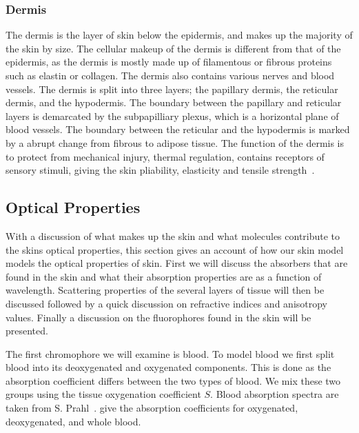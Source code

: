 \subsubsection*{Dermis} %
\label{sub:dermis}
The dermis is the layer of skin below the epidermis, and makes up the majority of the skin by size.
The cellular makeup of the dermis is different from that of the epidermis, as the dermis is mostly made up of filamentous or fibrous proteins such as elastin or collagen.
The dermis also contains various nerves and blood vessels.
The dermis is split into three layers; the papillary dermis, the reticular dermis, and the hypodermis.
The boundary between the papillary and reticular layers is demarcated by the subpapilliary plexus, which is a horizontal plane of blood vessels.
The boundary between the reticular and the hypodermis is marked by a abrupt change from fibrous to adipose tissue.
The function of the dermis is to protect from mechanical injury, thermal regulation, contains receptors of sensory stimuli, giving the skin pliability, elasticity and tensile strength~\cite{freedberg1999fitzpatrick,zaidi2010dermatology}.
 


\subsection*{Optical Properties} %
\label{sub:optical_properties}



With a discussion of what makes up the skin and what molecules contribute to the skins optical properties, this section gives an account of how our skin model models the optical properties of skin.
First we will discuss the absorbers that are found in the skin and what their absorption properties are as a function of wavelength.
Scattering properties of the several layers of tissue will then be discussed followed by a quick discussion on refractive indices and anisotropy values.
Finally a discussion on the fluorophores found in the skin will be presented.

\medskip

The first chromophore we will examine is blood.
To model blood we first split blood into its deoxygenated and oxygenated components.
This is done as the absorption coefficient differs between the two types of blood. We mix these two groups using the tissue oxygenation coefficient $S$. Blood absorption spectra are taken from S. Prahl~\cite{prahlblood}.
 give the absorption coefficients for oxygenated, deoxygenated, and whole blood.


